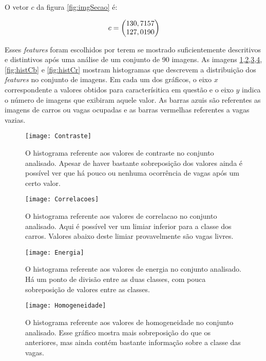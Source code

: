 O vetor $c$ da figura \ref{fig:imgSecao} é:

\begin{equation}
\centering
\centering
	c = \begin{pmatrix}
	130,7157\\127,0190
	\end{pmatrix}
\centering
\centering
\label{eq:exemploCrominancia}
\end{equation}


Esses \textit{features} foram escolhidos por terem se mostrado suficientemente descritivos e distintivos após uma análise de um conjunto de 90 imagens. As imagens \ref{fig:histContraste},\ref{fig:histCorrelacao},\ref{fig:histEnergia},\ref{fig:histHomo},\ref{fig:histCb} e \ref{fig:histCr} mostram histogramas que descrevem a distribuição dos \textit{features} no conjunto de imagens. Em cada um dos gráficos, o eixo $x$ correspondente a valores obtidos para caracterísitica em questão e o eixo $y$ indica o número de imagens que exibiram aquele valor. As barras azuis são referentes as imagens de carros ou vagas ocupadas e as barras vermelhas referentes a vagas vazias.

\begin{figure}
	\centering
	\texttt{[image: Contraste]}
	\label{fig:histContraste}
	\caption{O histograma referente aos valores de contraste no conjunto analisado. Apesar de haver bastante sobreposição dos valores ainda é possível ver que há pouco ou nenhuma ocorrência de vagas após um certo valor.}
	\centering
\end{figure}

\begin{figure}
	\centering
	\texttt{[image: Correlacoes]}
	\label{fig:histCorrelacao}
	\caption{O histograma referente aos valores de correlacao no conjunto analisado. Aqui é possível ver um limiar inferior para a classe dos carros. Valores abaixo deste limiar provavelmente são vagas livres.}
	\centering
\end{figure}

\begin{figure}
	\centering
	\texttt{[image: Energia]}
	\label{fig:histEnergia}
	\caption{O histograma referente aos valores de energia no conjunto analisado. Há um ponto de divisão entre as duas classes, com pouca sobreposição de valores entre as classes.}
	\centering
\end{figure}

\begin{figure}
	\centering
	\texttt{[image: Homogeneidade]}
	\label{fig:histHomo}
	\caption{O histograma referente aos valores de homogeneidade no conjunto analisado. Esse gráfico mostra mais sobreposição do que os anteriores, mas ainda contém bastante informação sobre a classe das vagas. }
	\centering
\end{figure}

